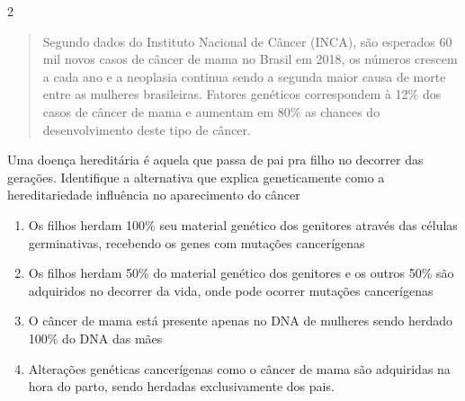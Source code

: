 {{

\num{2}
\begin{quote}
Segundo dados do Instituto Nacional de Câncer (INCA), são esperados
60 mil novos casos de câncer de mama no Brasil em 2018, os números
crescem a cada ano e a neoplasia continua sendo a segunda maior causa
de morte entre as mulheres brasileiras. Fatores genéticos correspondem
à 12\% dos casos de câncer de mama e aumentam em 80\% as chances do
desenvolvimento deste tipo de câncer.

\end{quote}

Uma doença hereditária é aquela que passa de pai pra filho no decorrer
das gerações. Identifique a alternativa que explica geneticamente como a
hereditariedade influência no aparecimento do câncer

\begin{enumerate}
\item
  Os filhos herdam 100\% seu material genético dos genitores através das
  células germinativas, recebendo os genes com mutações cancerígenas
\item
  Os filhos herdam 50\% do material genético dos genitores e os outros
  50\% são adquiridos no decorrer da vida, onde pode ocorrer mutações
  cancerígenas
\item
  O câncer de mama está presente apenas no DNA de mulheres sendo herdado
  100\% do DNA das mães
\item
  Alterações genéticas cancerígenas como o câncer de mama são adquiridas
  na hora do parto, sendo herdadas exclusivamente dos pais.
\end{enumerate}

}}
